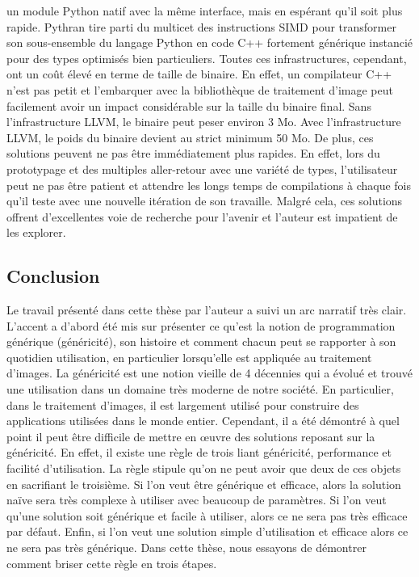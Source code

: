 un module Python natif avec la même interface, mais en espérant qu'il soit plus rapide. Pythran tire parti du
multic\oeur et des instructions SIMD pour transformer son sous-ensemble du langage Python en code C++ fortement
générique instancié pour des types optimisés bien particuliers. Toutes ces infrastructures, cependant, ont un coût élevé
en terme de taille de binaire. En effet, un compilateur C++ n'est pas petit et l'embarquer avec la bibliothèque de
traitement d'image peut facilement avoir un impact considérable sur la taille du binaire final. Sans l'infrastructure
LLVM, le binaire peut peser environ 3 Mo. Avec l'infrastructure LLVM, le poids du binaire devient au strict minimum 50
Mo. De plus, ces solutions peuvent ne pas être immédiatement plus rapides. En effet, lors du prototypage et des
multiples aller-retour avec une variété de types, l'utilisateur peut ne pas être patient et attendre les longs temps de
compilations à chaque fois qu'il teste avec une nouvelle itération de son travaille. Malgré cela, ces solutions
offrent d'excellentes voie de recherche pour l'avenir et l'auteur est impatient de les explorer.


\subsection*{Conclusion}


Le travail présenté dans cette thèse par l'auteur a suivi un arc narratif très clair. L'accent a d'abord été mis sur
présenter ce qu'est la notion de programmation générique (généricité), son histoire et comment chacun peut se rapporter
à son quotidien utilisation, en particulier lorsqu'elle est appliquée au traitement d'images. La généricité est une
notion vieille de 4 décennies qui a évolué et trouvé une utilisation dans un domaine très moderne de notre société. En
particulier, dans le traitement d'images, il est largement utilisé pour construire des applications utilisées dans le
monde entier. Cependant, il a été démontré à quel point il peut être difficile de mettre en œuvre des solutions reposant
sur la généricité. En effet, il existe une règle de trois liant généricité, performance et facilité d'utilisation. La
règle stipule qu'on ne peut avoir que deux de ces objets en sacrifiant le troisième. Si l'on veut être générique et
efficace, alors la solution naïve sera très complexe à utiliser avec beaucoup de paramètres. Si l'on veut qu'une
solution soit générique et facile à utiliser, alors ce ne sera pas très efficace par défaut. Enfin, si l'on veut une
solution simple d'utilisation et efficace alors ce ne sera pas très générique. Dans cette thèse, nous essayons de
démontrer comment briser cette règle en trois étapes.

